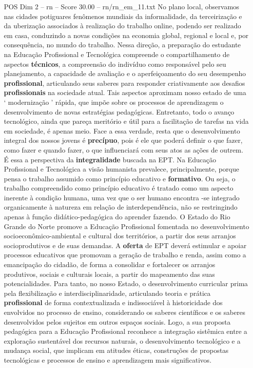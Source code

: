 \begin{textsample}{POS Dim 2 – rn – Score 30.00 – rn/rn\_em\_11.txt}
No plano local, observamos nas cidades potiguares fenômenos mundiais da informalidade, da terceirização e da uberização associados à realização do trabalho online, podendo ser realizado em casa, conduzindo a novas condições na economia global, regional e local e, por consequência, no mundo do trabalho.
Nessa direção, a preparação do estudante na Educação Profissional e Tecnológica compreende o compartilhamento de aspectos \textbf{técnicos}, a compreensão do indivíduo como responsável pelo seu planejamento, a capacidade de avaliação e o aperfeiçoamento do seu desempenho \textbf{profissional}, articulando seus saberes para responder criativamente aos desafios \textbf{profissionais} na sociedade atual.
Tais aspectos aproximam nosso estado de uma ‘ modernização ’ rápida, que impõe sobre os processos de aprendizagem o desenvolvimento de novas estratégias pedagógicas.
Entretanto, todo o avanço tecnológico, ainda que pareça meritório e útil para a facilitação de tarefas na vida em sociedade, é apenas meio.
Face a essa verdade, resta que o desenvolvimento integral dos nossos jovens é \textbf{precípuo}, pois é ele que poderá definir o que fazer, como fazer e quando fazer, o que influenciará com seus atos as ações de outrem.
É essa a perspectiva da \textbf{integralidade} buscada na EPT.
Na Educação Profissional e Tecnológica a visão humanista prevalece, principalmente, porque pensa o trabalho assumido como princípio educativo e \textbf{formativo}.
Ou seja, o trabalho compreendido como princípio educativo é tratado como um aspecto inerente à condição humana, uma vez que o ser humano encontra -se integrado organicamente à natureza em relação de interdependência, não se restringindo apenas à função didático-pedagógica do aprender fazendo.
O Estado do Rio Grande do Norte promove a Educação Profissional fomentada no desenvolvimento socioeconômico-ambiental e cultural dos territórios, a partir dos seus arranjos socioprodutivos e de suas demandas.
A \textbf{oferta} de EPT deverá estimular e apoiar processos educativos que promovam a geração de trabalho e renda, assim como a emancipação do cidadão, de forma a consolidar e fortalecer os arranjos produtivos, sociais e culturais locais, a partir do mapeamento das suas potencialidades.
Para tanto, no nosso Estado, o desenvolvimento curricular prima pela flexibilização e interdisciplinaridade, articulando teoria e prática \textbf{profissional} de forma contextualizada e indissociável à historicidade dos envolvidos no processo de ensino, considerando os saberes científicos e os saberes desenvolvidos pelos sujeitos em outros espaços sociais.
Logo, a sua proposta pedagógica para a Educação Profissional reconhece a integração sistêmica entre a exploração sustentável dos recursos naturais, o desenvolvimento tecnológico e a mudança social, que implicam em atitudes éticas, construções de propostas tecnológicas e processos de ensino e aprendizagem mais significativos.


\end{textsample}
